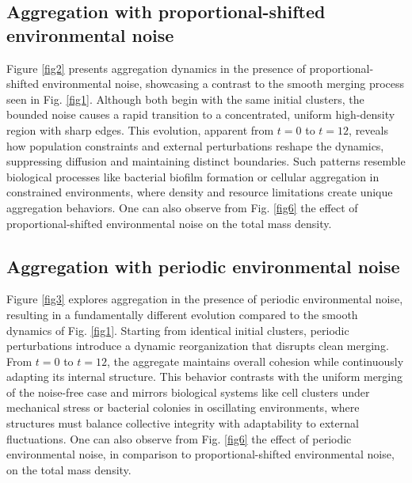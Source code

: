 \documentclass[10pt,number,preprint,times]{elsarticle}
\numberwithin{equation}{section} %
\begin{document}
\subsection{Aggregation with proportional-shifted environmental noise}
Figure \ref{fig2} presents aggregation dynamics in the presence of proportional-shifted environmental noise, showcasing a contrast to the smooth merging process seen in Fig. \ref{fig1}. Although both begin with the same initial clusters, the bounded noise causes a rapid transition to a concentrated, uniform high-density region with sharp edges. This evolution, apparent from $t=0$ to $t=12$, reveals how population constraints and external perturbations reshape the dynamics, suppressing diffusion and maintaining distinct boundaries. Such patterns resemble biological processes like bacterial biofilm formation or cellular aggregation in constrained environments, where density and resource limitations create unique aggregation behaviors. One can also observe from Fig. \ref{fig6} the effect of proportional-shifted environmental noise on the total mass  density.
\subsection{Aggregation with periodic environmental noise}
Figure \ref{fig3} explores aggregation in the presence of periodic environmental noise, resulting in a fundamentally different evolution compared to the smooth dynamics of Fig. \ref{fig1}. Starting from identical initial clusters, periodic perturbations introduce a dynamic reorganization that disrupts clean merging. From $t=0$ to $t=12$, the aggregate maintains overall cohesion while continuously adapting its internal structure. This behavior contrasts with the uniform merging of the noise-free case and mirrors biological systems like cell clusters under mechanical stress or bacterial colonies in oscillating environments, where structures must balance collective integrity with adaptability to external fluctuations. One can also observe from Fig. \ref{fig6} the effect of periodic environmental noise, in comparison to proportional-shifted environmental noise, on the total mass  density.
\end{document}
